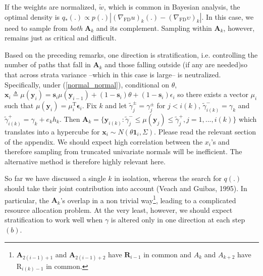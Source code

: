 \documentclass{article}
\begin{document}
If the weights are normalized, $\tilde w$, which is common in
Bayesian analysis, the optimal density is $q_*(.)\propto p(.)
|(\nabla_{\mathrm{\scriptscriptstyle FD}}
u)_k(.)-(\nabla_{\mathrm{\scriptscriptstyle FD}} \upsilon)_k|$. In
this case, we need to sample from \emph{both} $\mathbf{A}_k$ and its
complement. Sampling within $\mathbf{A}_k$, however, remains just as
critical and difficult.

Based on the preceding remarks, one direction is stratification,
i.e. controlling the number of paths that fall in $\mathbf{A}_k$ and
those falling outside (if any are needed)so that across strata
variance --which in this case is large-- is neutralized.
Specifically, under (\ref{normal_normal}), conditional on $\theta$,
$\mathbf{x}_i\triangleq\mu(\mathbf{y}_{i})=\mathbf{s}_{i}\mu(\mathbf{y}_{i-1})+(1-\mathbf{s}_{i})\theta+(1-\mathbf{s}_{i})\epsilon_i$
so there exists a vector $\mu_i$ such that
$\mu(\mathbf{y}_{i})=\mu_i^{\mathrm{T}}\mathbf{\epsilon}_i$. Fix $k$
and let $\tilde\gamma_{j}^{\pm}=\gamma_{j}^{\pm}$ for  $j<i(k)$,
$\tilde\gamma_{i(k)}^{-}=\gamma_k$ and
$\tilde\gamma_{i(k)}^{+}=\gamma_k+e_k h_k$. Then
$\mathbf{A}_k=\{\mathbf{y}_{i(k)}:
\tilde\gamma_{j}^{-}\leq\mu(\mathbf{y}_j)\leq\tilde\gamma_{j}^{+},
j=1,...,i(k)\}$ which translates into a hypercube for
$\mathbf{x}_i\sim N(\theta\boldsymbol{1}_i ,\Sigma)$. Please read
the relevant section of the appendix. We should expect high
correlation between the $x_i$'s and therefore sampling from
truncated univariate normals will be inefficient. The alternative
method is therefore highly relevant here.

So far we have discussed a single $k$ in isolation, whereas the
search for $q(.)$ should take their joint contribution into account
(Veach and Guibas, 1995). In particular, the $\mathbf{A}_k$'s
overlap in a non trivial way\footnote{$\mathbf{A}_{2(i-1)+1}$ and
$\mathbf{A}_{2(i-1)+2}$ have $\mathbf{R}_{i-1}$ in common and
$A_{k}$ and $A_{k+2}$ have $\mathrm{R}_{i(k)-1}$ in common.},
leading to a complicated resource allocation problem. At the very
least, however, we should expect stratification to work well when
$\gamma$ is altered only in one direction at each step $(b)$.
\end{document}
